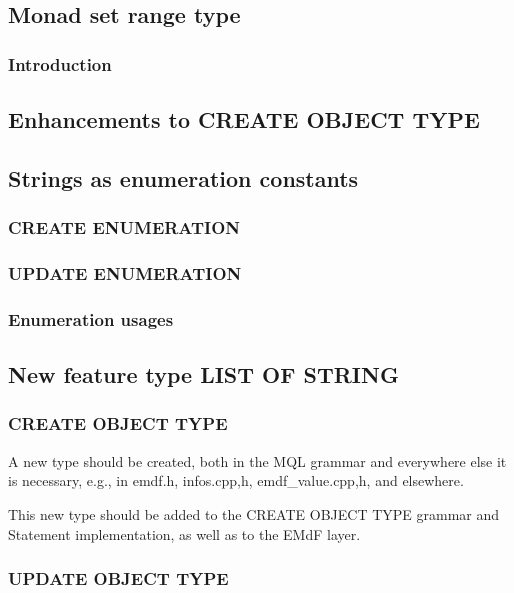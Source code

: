\documentclass[a4paper,12pt]{article}
\begin{document}
\subsection{Monad set range type}

\subsubsection{Introduction}

\subsection{Enhancements to CREATE OBJECT TYPE}

\subsection{Strings as enumeration constants}

\subsubsection{CREATE ENUMERATION}
\subsubsection{UPDATE ENUMERATION}
\subsubsection{Enumeration usages}

\subsection{New feature type LIST OF STRING}

\subsubsection{CREATE OBJECT TYPE}

A new type should be created, both in the MQL grammar and everywhere
else it is necessary, e.g., in emdf.h, infos.{cpp,h},
emdf\_value.{cpp,h}, and elsewhere.

This new type should be added to the CREATE OBJECT TYPE grammar and
Statement implementation, as well as to the EMdF layer.

\subsubsection{UPDATE OBJECT TYPE}
\end{document}
